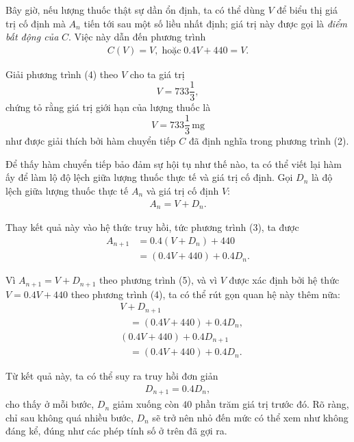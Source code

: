 {\begin{description}
      Bây giờ, nếu lượng thuốc thật sự dần ổn định, ta có thể dùng $V$ để biểu thị giá trị cố định mà $A_n$ tiến tới sau một số liều nhất định; giá trị này được gọi là \emph{điểm bất động của} $C$. Việc này dẫn đến phương trình
      \begin{align*}
        C(V)=V, \; \text{hoặc} \; 0.4V+440=V. \tag{4}
      \end{align*}

      Giải phương trình (4) theo $V$ cho ta giá trị
      $$
        V=733\frac{1}{3},
      $$
      chứng tỏ rằng giá trị giới hạn của lượng thuốc là\vspace{\baselineskip}
      $$
        V=733\frac{1}{3} \, \text{mg}
      $$
      như được giải thích bởi hàm chuyển tiếp $C$ đã định nghĩa trong phương trình (2).

      Để thấy hàm chuyển tiếp bảo đảm sự hội tụ như thế nào, ta có thể viết lại hàm ấy để làm lộ độ lệch giữa lượng thuốc thực tế và giá trị cố định. Gọi $D_n$ là độ lệch giữa lượng thuốc thực tế $A_n$ và giá trị cố định $V$:
      \begin{align*}
          A_n=V+D_n. \tag{5}
      \end{align*}

      Thay kết quả này vào hệ thức truy hồi, tức phương trình (3), ta được
      \begin{align*}
        A_{n+1}
          &=0.4(V+D_n)+440\\
          &=(0.4V+440)+0.4D_n. \tag{6}
      \end{align*}

      Vì $A_{n+1}=V+D_{n+1}$ theo phương trình (5), và vì $V$ được xác định bởi hệ thức $V=0.4V+440$ theo phương trình (4), ta có thể rút gọn quan hệ này thêm nữa:
      \begin{align*}
        &V+D_{n+1} \\
        &\quad =(0.4V+440)+0.4D_n, \\
        & (0.4V+440)+0.4D_{n+1} \\
        &\quad =(0.4V+440)+0.4D_n.
      \end{align*}

      Từ kết quả này, ta có thể suy ra truy hồi đơn giản
      \begin{align*}
          D_{n+1}=0.4D_n, \tag{7}
      \end{align*}
      cho thấy ở mỗi bước, $D_n$ giảm xuống còn $40$ phần trăm giá trị trước đó. Rõ ràng, chỉ sau không quá nhiều bước, $D_n$ sẽ trở nên nhỏ đến mức có thể xem như không đáng kể, đúng như các phép tính số ở trên đã gợi ra.
    \end{description}

}
